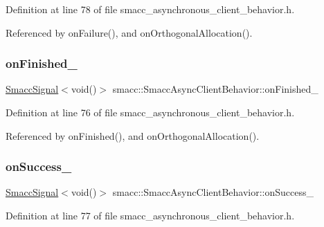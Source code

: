 Definition at line 78 of file smacc\+\_\+asynchronous\+\_\+client\+\_\+behavior.\+h.



Referenced by on\+Failure(), and on\+Orthogonal\+Allocation().

\mbox{\label{classsmacc_1_1SmaccAsyncClientBehavior_a3b4f8bbacabffb8a37934407bc79ed80}} 
\subsubsection{\texorpdfstring{on\+Finished\+\_\+}{onFinished\_}}
{\footnotesize\ttfamily \hyperlink{classsmacc_1_1SmaccSignal}{Smacc\+Signal}$<$void()$>$ smacc\+::\+Smacc\+Async\+Client\+Behavior\+::on\+Finished\+\_\+\hspace{0.3cm}{\ttfamily [private]}}



Definition at line 76 of file smacc\+\_\+asynchronous\+\_\+client\+\_\+behavior.\+h.



Referenced by on\+Finished(), and on\+Orthogonal\+Allocation().

\mbox{\label{classsmacc_1_1SmaccAsyncClientBehavior_a31d8bdfa46fe70aea9adf0958806462b}} 
\subsubsection{\texorpdfstring{on\+Success\+\_\+}{onSuccess\_}}
{\footnotesize\ttfamily \hyperlink{classsmacc_1_1SmaccSignal}{Smacc\+Signal}$<$void()$>$ smacc\+::\+Smacc\+Async\+Client\+Behavior\+::on\+Success\+\_\+\hspace{0.3cm}{\ttfamily [private]}}



Definition at line 77 of file smacc\+\_\+asynchronous\+\_\+client\+\_\+behavior.\+h.



